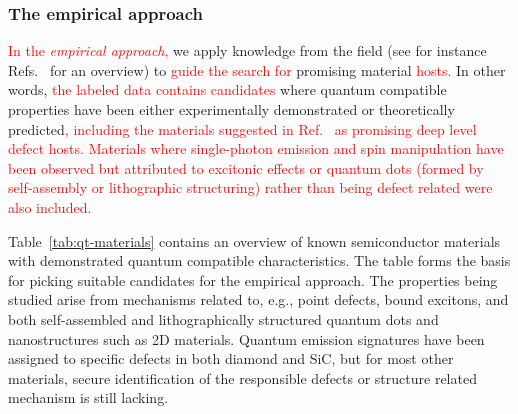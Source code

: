 \documentclass[superscriptaddress,unsortedaddress,
 amsmath,amssymb,
 aps,
]{revtex4-2}
\newcommand{\mrk}[1]{\textcolor{red}{#1}}
\begin{document}
\subsubsection*{The empirical approach} 
\mrk{In the \emph{empirical approach},} we apply knowledge from the field (see for instance  Refs.~\cite{Atatuere2018,Toth2019,Zhang2020,Son2020} for an overview) to \mrk{guide the search for} promising material \mrk{hosts.}  
In other words, \mrk{the labeled data contains candidates} where quantum compatible properties have been either experimentally demonstrated or theoretically predicted\mrk{, including the materials suggested in Ref.~\cite{Weber2010} as promising deep level defect hosts.} 
\mrk{Materials where single-photon emission and spin manipulation have been observed but attributed to excitonic effects or quantum dots (formed by self-assembly or lithographic structuring) rather than being defect related were also included.} 


Table~\ref{tab:qt-materials} contains an overview of known semiconductor materials with demonstrated quantum compatible characteristics. The table forms the basis for picking suitable candidates for the empirical approach. The properties being studied arise from mechanisms related to, e.g., point defects, bound excitons, and both self-assembled and lithographically structured quantum dots and nanostructures such as 2D materials. 
Quantum emission signatures have been assigned to specific defects in both diamond and SiC, but for most other materials, secure identification of the responsible defects or structure related mechanism is still lacking.  
\end{document}
